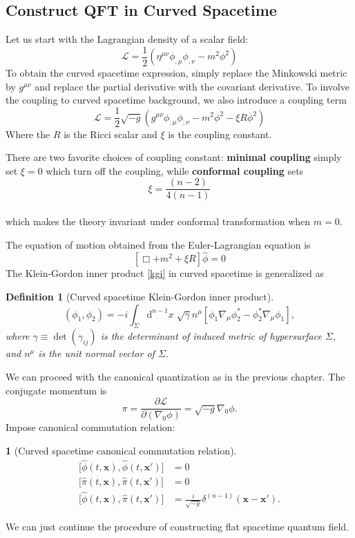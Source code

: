 \documentclass[12pt]{article}
\numberwithin{equation}{section}
\theoremstyle{1style}
\newtheorem{definition}[equation]{Definition}
\newtheorem{cthm}[equation]{}
\newcommand{\p}{\partial}
\newcommand{\id}{\mathrm{d}}
\begin{document}
\subsection{Construct QFT in Curved Spacetime}
Let us start with the Lagrangian density of a scalar field:
\[\mathcal{L} = \frac{1}{2}(\eta^{\mu\nu} \phi_{,\mu} \phi_{,\nu}- m^2 \phi^2)\]
To obtain the curved spacetime expression,
simply replace the Minkowski metric by \(g^{\mu\nu}\) and replace the partial derivative with the covariant derivative.
To involve the coupling to curved spacetime background, we also introduce a coupling term
\begin{equation}
  \mathcal{L} = \frac{1}{2}\sqrt{-g}(g^{\mu\nu} \phi_{;\mu} \phi_{;\nu}- m^2 \phi^2-\xi R \phi^2)
\end{equation}
Where the \(R\) is the Ricci scalar and \(\xi\) is the coupling constant.\par
There are two favorite choices of coupling constant:
\textbf{minimal coupling} simply set \(\xi=0\) which turn off the coupling,
while \textbf{conformal coupling} sets \[\xi = \frac{(n-2)}{4(n-1)}\]\\
which makes the theory invariant under conformal transformation when \(m=0\).


The equation of motion obtained from the Euler-Lagrangian equation is
\begin{equation}
  \left[\Box+m^2+\xi R\right]\hat{\phi}=0
\end{equation}
The Klein-Gordon inner product \ref{kgi} in curved spacetime is generalized as
\begin{definition}[Curved spacetime Klein-Gordon inner product]
  \[(\phi_1,\phi_2)=-i\int_{\Sigma}\id^{n-1}x\;\sqrt{\gamma}n^{\mu}\left[\phi_1\nabla_\mu\phi^*_2-\phi_2^*\nabla_\mu\phi_1\right],\]
  where \(\gamma\equiv \det(\gamma_{ij})\) is the determinant of induced metric of hypersurface \(\Sigma\),
  and \(n^{\mu}\) is the unit normal vector of \(\Sigma\).
\end{definition}

We can proceed with the canonical quantization as in the previous chapter.
The conjugate momentum is
\begin{equation}
  \pi=\frac{\p \mathcal{L}}{\p(\nabla_{0}\phi)}=\sqrt{-g}\nabla_{0}\phi.
\end{equation}
Impose canonical commutation relation:
\begin{cthm}[Curved spacetime canonical commutation relation]\label{cccr}
  \begin{align*}
    \bigl[\hat{\phi}(t,\mathbf{x}),\hat{\phi}(t,\mathbf{x'})\bigr] & =0                                                         \\
    \bigl[\hat{\pi}(t,\mathbf{x}),\hat{\pi}(t,\mathbf{x'})\bigr]   & =0                                                         \\
    \bigl[\hat{\phi}(t,\mathbf{x}),\hat{\pi}(t,\mathbf{x'})\bigr]  & =\frac{i}{\sqrt{-g}}\delta^{(n-1)}(\mathbf{x}-\mathbf{x'}).
  \end{align*}
\end{cthm}
We can just continue the procedure of constructing flat spacetime quantum field.
\end{document}
